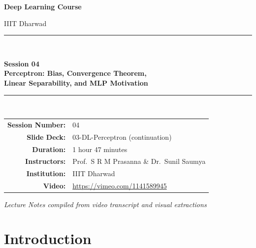 \documentclass[12pt,a4paper]{article}
\begin{document}
\begin{titlepage}
  \centering
  \vspace*{2cm}
  {\Large\bfseries Deep Learning Course\par}
  \vspace{0.5cm}
  {\large IIIT Dharwad\par}
  \vspace{1.5cm}
  \rule{\linewidth}{0.5mm}\\[0.4cm]
  {\huge\bfseries Session 04\\[0.3cm]
   Perceptron: Bias, Convergence Theorem,\\
   Linear Separability, and MLP Motivation\par}
  \rule{\linewidth}{0.5mm}\\[1.5cm]

  \begin{tabular}{rl}
    \textbf{Session Number:} & 04 \\[4pt]
    \textbf{Slide Deck:}     & 03-DL-Perceptron (continuation) \\[4pt]
    \textbf{Duration:}       & 1 hour 47 minutes \\[4pt]
    \textbf{Instructors:}    & Prof.\ S R M Prasanna \& Dr.\ Sunil Saumya \\[4pt]
    \textbf{Institution:}    & IIIT Dharwad \\[4pt]
    \textbf{Video:}          & \url{https://vimeo.com/1141589945} \\[4pt]
  \end{tabular}

  \vfill
  {\large\itshape Lecture Notes compiled from video transcript and visual extractions\par}
\end{titlepage}

\tableofcontents
\newpage

\section{Introduction}
\label{sec:intro}
\end{document}
